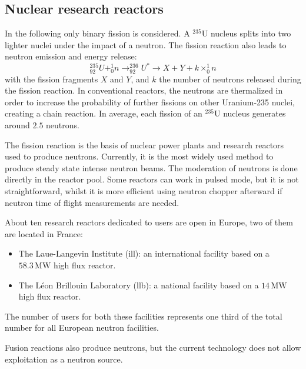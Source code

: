 \begin{refsection}
  \subsection{Nuclear research reactors}
  In the following only binary fission is considered.
  A $^{235}$U nucleus splits into two lighter nuclei under the impact of a neutron. The fission reaction also leads to neutron emission and energy release:
  \begin{equation*}
    _{92}^{235}U + _{0}^{1}n \rightarrow _{92}^{236}U^* \rightarrow X + Y + k \times _{0}^{1}n
  \end{equation*}
  with the fission fragments $X$ and $Y$, and $k$ the number of neutrons released during the fission reaction. In conventional reactors, the neutrons are thermalized in order to increase the probability of further fissions on other Uranium-235 nuclei, creating a chain reaction. In average, each fission of an $^{235}$U nucleus generates around $2.5$ neutrons.

  The fission reaction is the basis of nuclear power plants and research reactors used to produce neutrons.
  Currently, it is the most widely used method to produce steady state intense neutron beams. The moderation of neutrons is done directly in the reactor pool.
  Some reactors can work in pulsed mode, but it is not straightforward, whilst it is more efficient using neutron chopper afterward if neutron time of flight measurements are needed.

  About ten research reactors dedicated to users are open in Europe, two of them are located in France:
  \begin{itemize}
    \item The Laue-Langevin Institute (\acrshort{ill}): an international facility based on a $58.3\,\mathrm{MW}$ high flux reactor.
    \item The Léon Brillouin Laboratory (\acrshort{llb}): a national facility based on a $14\,\mathrm{MW}$ high flux reactor.
  \end{itemize}
  The number of users for both these facilities represents one third of the total number for all European neutron facilities.

  Fusion reactions also produce neutrons, but the current technology does not allow exploitation as a neutron source.


\end{refsection}
